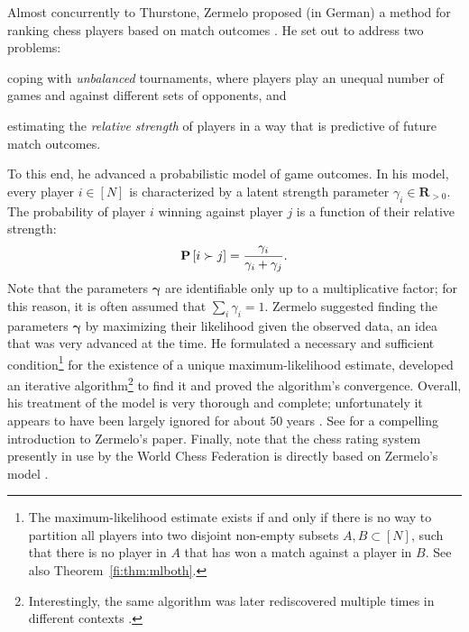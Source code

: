 Almost concurrently to Thurstone, Zermelo proposed (in German) a method for ranking chess players based on match outcomes \citep{zermelo1928berechnung}.
He set out to address two problems:
\begin{enuminline}
\item coping with \emph{unbalanced} tournaments, where players play an unequal number of games and against different sets of opponents, and
\item estimating the \emph{relative strength} of players in a way that is predictive of future match outcomes.
\end{enuminline}
To this end, he advanced a probabilistic model of game outcomes.
In his model, every player $i \in [N]$ is characterized by a latent strength parameter $\gamma_i \in \mathbf{R}_{>0}$.
The probability of player $i$ winning against player $j$ is a function of their relative strength:
\begin{align}
\label{in:eq:zermelo}
\mathbf{P}\left[ i \succ j \right] = \frac{\gamma_i}{\gamma_i + \gamma_j}.
\end{align}
Note that the parameters $\bm{\gamma}$ are identifiable only up to a multiplicative factor;
for this reason, it is often assumed that $\sum_i \gamma_i = 1$.
Zermelo suggested finding the parameters $\bm{\gamma}$ by maximizing their likelihood given the observed data, an idea that was very advanced at the time.
He formulated a necessary and sufficient condition\footnote{%
The maximum-likelihood estimate exists if and only if there is no way to partition all players into two disjoint non-empty subsets $A, B \subset [N]$, such that there is no player in $A$ that has won a match against a player in $B$.
See also Theorem~\ref{fi:thm:mlboth}.}
for the existence of a unique maximum-likelihood estimate, developed an iterative algorithm\footnote{%
Interestingly, the same algorithm was later rediscovered multiple times in different contexts \citep{bradley1952rank, ford1957solution, dykstra1960rank, hastie1998classification, hunter2004mm, caron2012efficient}.}
to find it and proved the algorithm's convergence.
Overall, his treatment of the model is very thorough and complete; unfortunately it appears to have been largely ignored for about 50 years \citep{david1988method}.
See \citet{glickman2013introductory} for a compelling introduction to Zermelo's paper.
Finally, note that the chess rating system presently in use by the World Chess Federation is directly based on Zermelo's model \citep{elo1978rating}.

